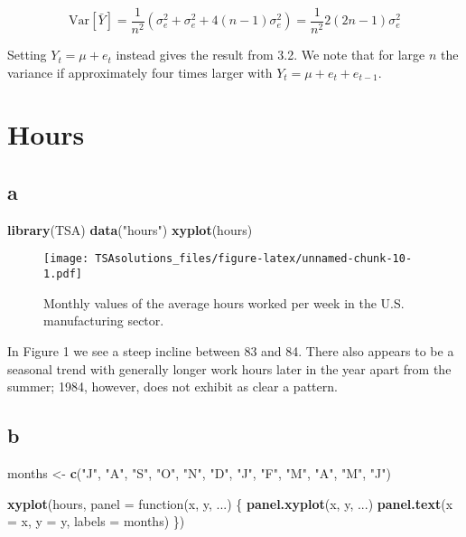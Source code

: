 \documentclass[]{book}
\newenvironment{Shaded}{\begin{snugshade}}{\end{snugshade}}
\newcommand{\KeywordTok}[1]{\textcolor[rgb]{0.13,0.29,0.53}{\textbf{{#1}}}}
\newcommand{\DataTypeTok}[1]{\textcolor[rgb]{0.13,0.29,0.53}{{#1}}}
\newcommand{\StringTok}[1]{\textcolor[rgb]{0.31,0.60,0.02}{{#1}}}
\newcommand{\NormalTok}[1]{{#1}}
\theoremstyle{definition}
\theoremstyle{definition}
\theoremstyle{remark}
\begin{document}
\[
  \text{Var}[\bar{Y}] = \frac{1}{n^2}(\sigma_e^2 + \sigma_e^2 + 4(n-1) \sigma_e^2 ) = \frac{1}{n^2}2(2n-1)\sigma_e^2
\]

Setting \(Y_t = \mu + e_t\) instead gives the result from 3.2. We note
that for large \(n\) the variance if approximately four times larger
with \(Y_t = \mu + e_t + e_{t-1}\).

\section{Hours}\label{hours}

\subsection*{a}\label{a-21}

\begin{Shaded}
\begin{Highlighting}[]
\KeywordTok{library}\NormalTok{(TSA)}
\KeywordTok{data}\NormalTok{(}\StringTok{"hours"}\NormalTok{)}
\KeywordTok{xyplot}\NormalTok{(hours)}
\end{Highlighting}
\end{Shaded}

\begin{figure}[htbp]
\centering
\texttt{[image: TSAsolutions\_files/figure-latex/unnamed-chunk-10-1.pdf]}
\caption{\label{fig:unnamed-chunk-10}Monthly values of the average hours
worked per week in the U.S. manufacturing sector.}
\end{figure}

In Figure 1 we see a steep incline between 83 and 84. There also appears
to be a seasonal trend with generally longer work hours later in the
year apart from the summer; 1984, however, does not exhibit as clear a
pattern.

\subsection*{b}\label{b-21}

\begin{Shaded}
\begin{Highlighting}[]
\NormalTok{months <-}\StringTok{ }\KeywordTok{c}\NormalTok{(}\StringTok{"J"}\NormalTok{, }\StringTok{"A"}\NormalTok{, }\StringTok{"S"}\NormalTok{, }\StringTok{"O"}\NormalTok{, }\StringTok{"N"}\NormalTok{, }\StringTok{"D"}\NormalTok{, }\StringTok{"J"}\NormalTok{, }\StringTok{"F"}\NormalTok{, }\StringTok{"M"}\NormalTok{, }\StringTok{"A"}\NormalTok{, }\StringTok{"M"}\NormalTok{, }\StringTok{"J"}\NormalTok{)}

\KeywordTok{xyplot}\NormalTok{(hours, }\DataTypeTok{panel =} \NormalTok{function(x, y, ...) \{}
  \KeywordTok{panel.xyplot}\NormalTok{(x, y, ...)}
  \KeywordTok{panel.text}\NormalTok{(}\DataTypeTok{x =} \NormalTok{x, }\DataTypeTok{y =} \NormalTok{y, }\DataTypeTok{labels =} \NormalTok{months)}
\NormalTok{\})}
\end{Highlighting}
\end{Shaded}
\end{document}
